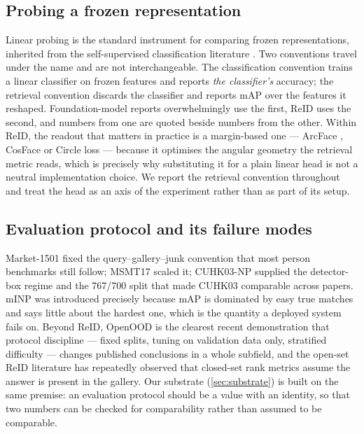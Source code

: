 \subsection{Probing a frozen representation}
Linear probing is the standard instrument for comparing frozen representations, inherited from
the self-supervised classification literature \cite{chen2020simclr,caron2021dino,oquab2024dinov2}.
Two conventions travel under the name and are not interchangeable. The classification
convention trains a linear classifier on frozen features and reports \emph{the classifier's}
accuracy; the retrieval convention discards the classifier and reports mAP over the features
it reshaped. Foundation-model reports overwhelmingly use the first, ReID uses the second, and
numbers from one are quoted beside numbers from the other. Within ReID, the readout that
matters in practice is a margin-based one --- ArcFace \cite{deng2019arcface},
CosFace \cite{wang2018cosface} or Circle loss \cite{sun2020circle} --- because it optimises the
angular geometry the retrieval metric reads, which is precisely why substituting it for a plain
linear head is not a neutral implementation choice. We report the retrieval convention
throughout and treat the head as an axis of the experiment rather than as part of its setup.

\subsection{Evaluation protocol and its failure modes}
Market-1501 \cite{zheng2015scalable} fixed the query--gallery--junk convention that most person
benchmarks still follow; MSMT17 \cite{wei2018msmt} scaled it; CUHK03-NP
\cite{zhong2017reranking} supplied the detector-box regime and the 767/700 split that made
CUHK03 comparable across papers. mINP \cite{ye2022deep} was introduced precisely because mAP is
dominated by easy true matches and says little about the hardest one, which is the quantity a
deployed system fails on. Beyond ReID, OpenOOD \cite{zhang2023openood} is the clearest recent
demonstration that protocol discipline --- fixed splits, tuning on validation data only,
stratified difficulty --- changes published conclusions in a whole subfield, and the
open-set ReID literature \cite{liao2014operid,li2018adversarial,wang2020gom} has repeatedly
observed that closed-set rank metrics assume the answer is present in the gallery. Our
substrate (\cref{sec:substrate}) is built on the same premise: an evaluation protocol should
be a value with an identity, so that two numbers can be checked for comparability rather than
assumed to be comparable.

